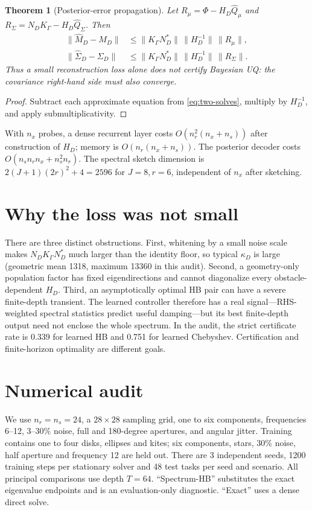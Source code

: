 \documentclass[10pt]{article}
\newtheorem{theorem}{Theorem}
\begin{document}
\begin{theorem}[Posterior-error propagation]
Let $R_\mu=\Phi-H_D\widehat Q_\mu$ and
$R_\Sigma=N_DK_\Gamma-H_D\widehat Q_\Sigma$.  Then
\begin{align*}
 \|\widehat M_D-M_D\|&\leq
 \|K_\Gamma N_D^*\|\,\|H_D^{-1}\|\,\|R_\mu\|,\\
 \|\widehat\Sigma_D-\Sigma_D\|&\leq
 \|K_\Gamma N_D^*\|\,\|H_D^{-1}\|\,\|R_\Sigma\|.
\end{align*}
Thus a small reconstruction loss alone does not certify Bayesian UQ: the
covariance right-hand side must also converge.
\end{theorem}
\begin{proof}
Subtract each approximate equation from \eqref{eq:two-solves}, multiply by
$H_D^{-1}$, and apply submultiplicativity.
\end{proof}

With $n_x$ probes, a dense recurrent layer costs
$O(n_r^2(n_x+n_s))$ after construction of $H_D$; memory is
$O(n_r(n_x+n_s))$.  The posterior decoder costs $O(n_sn_rn_x+n_s^2n_r)$.
The spectral sketch dimension is
$2(J+1)(2r)^2+4=2596$ for $J=8,r=6$, independent of $n_x$ after sketching.

\section{Why the loss was not small}
There are three distinct obstructions.  First, whitening by a small noise scale
makes $N_DK_\Gamma N_D^*$ much larger than the identity floor, so typical
$\kappa_D$ is large (geometric mean 1318, maximum
13360 in this audit).  Second, a geometry-only population factor has fixed
eigendirections and cannot diagonalize every obstacle-dependent $H_D$.
Third, an asymptotically optimal HB pair can have a severe finite-depth
transient.  The learned controller therefore has a real signal---RHS-weighted
spectral statistics predict useful damping---but its best finite-depth output
need not enclose the whole spectrum.  In the audit, the strict certificate rate
is 0.339 for learned HB and 0.751 for learned
Chebyshev.  Certification and finite-horizon optimality are different goals.

\section{Numerical audit}
We use $n_r=n_s=24$, a
$28\times28$ sampling grid, one to six
components, frequencies 6--12, 3--30\% noise, full and 180-degree apertures,
and angular jitter.  Training contains one to four disks, ellipses and kites;
six components, stars, 30\% noise, half aperture and frequency 12 are held out.
There are 3 independent seeds, 1200
training steps per stationary solver and 48
test tasks per seed and scenario.  All principal comparisons use depth
$T=64$.  ``Spectrum-HB'' substitutes the exact eigenvalue endpoints and is
an evaluation-only diagnostic.  ``Exact'' uses a dense direct solve.
\end{document}
